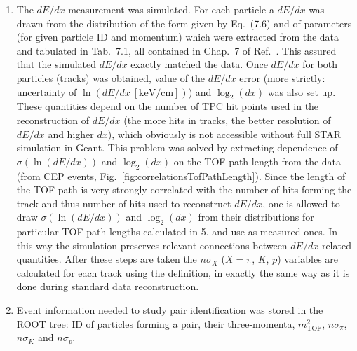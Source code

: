 \begin{enumerate}
 \item The $dE/dx$ measurement was simulated. For each particle a $dE/dx$ was drawn from the distribution of the form given by Eq.~(7.6) and of parameters (for given particle ID and momentum) which were extracted from the data and tabulated in Tab.~7.1, all contained in Chap.~7 of Ref.~\cite{supplementaryNote}. This assured that the simulated $dE/dx$ exactly matched the data. Once $dE/dx$ for both particles (tracks) was obtained, value of the $dE/dx$ error (more strictly: uncertainty of $\ln(dE/dx~[\text{keV/cm}])$) and $\log_{2}(dx)$ was also set up. These quantities depend on the number of TPC hit points used in the reconstruction of $dE/dx$ (the more hits in tracks, the better resolution of $dE/dx$ and higher $dx$), which obviously is not accessible without full STAR simulation in Geant. This problem was solved by extracting dependence of $\sigma(\ln(dE/dx))$ and $\log_{2}(dx)$ on the TOF path length from the data (from CEP events, Fig.~\ref{fig:correlationsTofPathLength}). Since the length of the TOF path is very strongly correlated with the number of hits forming the track and thus number of hits used to reconstruct $dE/dx$, one is allowed to draw $\sigma(\ln(dE/dx))$ and $\log_{2}(dx)$ from their distributions for particular TOF path lengths calculated in 5. and use as measured ones. In this way the simulation preserves relevant connections between $dE/dx$-related quantities. After these steps are taken the $n\sigma_{X}$ ($X=\pi$, $K$, $p$) variables are calculated for each track using the definition, in exactly the same way as it is done during standard data reconstruction.
 \item Event information needed to study pair identification was stored in the ROOT tree: ID of particles forming a pair, their three-momenta, $m^{2}_{\text{TOF}}$, $n\sigma_{\pi}$, $n\sigma_{K}$ and $n\sigma_{p}$.
\end{enumerate}

